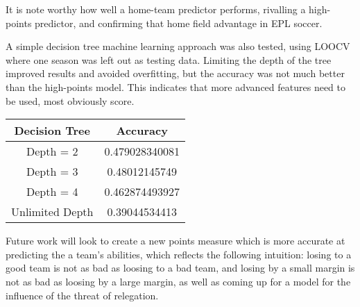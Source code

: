 \documentclass[conference]{IEEEtran}
\begin{document}
It is note worthy how well a home-team predictor performs, rivalling a high-points predictor, and confirming that home field advantage in EPL soccer.

A simple decision tree machine learning approach was also tested, using LOOCV where one season was left out as testing data. Limiting the depth of the tree improved results and avoided overfitting, but the accuracy was not much better than the high-points model.  This indicates that more advanced features need to be used, most obviously score.

\begin{center}
  \begin{tabular}{@{} cc @{}}
    \hline
    Decision Tree & Accuracy \\ 
    \hline
Depth = 2 &0.479028340081\\ 
    Depth = 3 & 0.48012145749\\ 
   Depth = 4 & 0.462874493927 \\ 
    Unlimited Depth & 0.39044534413\\ 
    \hline
  \end{tabular}
\end{center}

Future work will look to create a new points measure which is more accurate at predicting the a team's abilities, which reflects the following intuition: losing to a good team is not as bad as loosing to a bad team, and losing by a small margin is not as bad as loosing by a large margin, as well as coming up for a model for the influence of the threat of relegation. 

\nocite{*}


\clearpage

%
%
%
%




\end{document}
